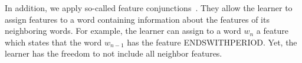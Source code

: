 In addition, we apply so-called \glspl{feature conjunction}~\citep{mccallum2002mallet}.
They allow the learner to assign features to a word containing information about the features of its neighboring words.
For example, the learner can assign to a word $w_n$ a feature which states that the word $w_{n-1}$ has the feature ENDSWITHPERIOD.{}
Yet, the learner has the freedom to not include all neighbor features.

